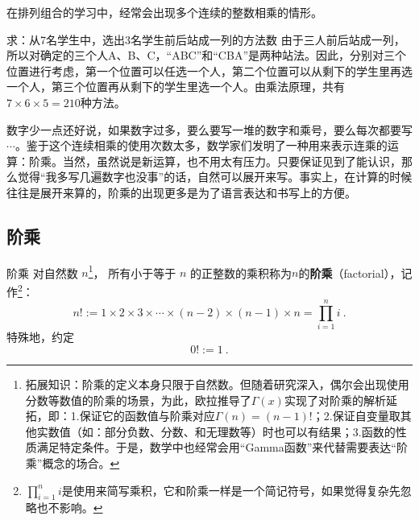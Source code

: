 
\begin{issues}
\issueDraft
\end{issues}


在排列组合的学习中，经常会出现多个连续的整数相乘的情形。

\begin{example}{求：从7名学生中，选出3名学生前后站成一列的方法数}\label{ex_factor_1}
由于三人前后站成一列，所以对确定的三个人A、B、C，“ABC”和“CBA”是两种站法。因此，分别对三个位置进行考虑，第一个位置可以任选一个人，第二个位置可以从剩下的学生里再选一个人，第三个位置再从剩下的学生里选一个人。由乘法原理，共有$7\times6\times5=210$种方法。
\end{example}

数字少一点还好说，如果数字过多，要么要写一堆的数字和乘号，要么每次都要写$\cdots$。鉴于这个连续相乘的使用次数太多，数学家们发明了一种用来表示连乘的运算：阶乘。当然，虽然说是新运算，也不用太有压力。只要保证见到了能认识，那么觉得“我多写几遍数字也没事”的话，自然可以展开来写。事实上，在计算的时候往往是展开来算的，阶乘的出现更多是为了语言表达和书写上的方便。

\subsection{阶乘}

\begin{definition}{阶乘}
对自然数 $n$\footnote{拓展知识：阶乘的定义本身只限于自然数。但随着研究深入，偶尔会出现使用分数等数值的阶乘的场景，为此，欧拉推导了$\Gamma(x)$实现了对阶乘的解析延拓，即：1.保证它的函数值与阶乘对应$\Gamma(n)=(n-1)!$；2.保证自变量取其他实数值（如：部分负数、分数、和无理数等）时也可以有结果；3.函数的性质满足特定条件。于是，数学中也经常会用“Gamma函数”来代替需要表达“阶乘”概念的场合。}， 所有小于等于 $n$ 的正整数的乘积称为$n$的\textbf{阶乘}（factorial），记作\footnote{$\prod_{i = 1}^n i$是使用来简写乘积，它和阶乘一样是一个简记符号，如果觉得复杂先忽略也不影响。}：
\begin{equation}
n! := 1 \times 2 \times 3 \times \cdots \times(n - 2)\times(n - 1)\times n=\prod_{i = 1}^n i ~.
\end{equation}
特殊地，约定
\begin{equation}
0! := 1~.
\end{equation}
\end{definition}

